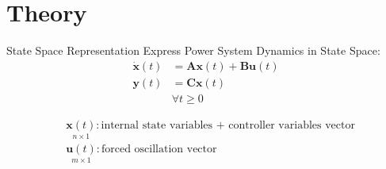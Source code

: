 \section[Theory]{Theory}
\label{sec:lasso_theory}

\begin{frame}[fragile]{State Space Representation}
	Express Power System Dynamics in State Space:
	\begin{equation}
				\label{eq:ssr}
		\begin{align*}
			\dot{\textbf{x}}(t) &= 
			\textbf{A}\textbf{x}(t)
			+ \textbf{B}\textbf{u}(t)\\
			\textbf{y}(t) &= 
			\textbf{C}\textbf{x}(t)\\  
			& \forall t\geq0	
		\end{align*}
	\end{equation}
	
	\begin{align*}
		& \underset{\scriptscriptstyle n\times 1}{\textbf{x}(t)} : \text{internal state variables + controller variables vector}                                                                      \\
		& \underset{\scriptscriptstyle m\times 1}{\textbf{u}(t)} : \text{forced oscillation vector}
	\end{align*}
\end{frame}